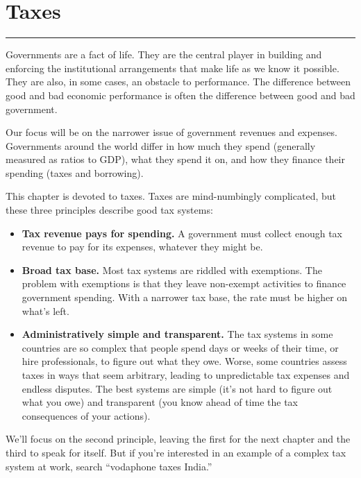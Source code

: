 \chapter{Taxes}\label{chp:tax}
\hypertarget{taxes}{}


\rule{\textwidth}{1pt}

Governments are a fact of life. They are the central player in building and enforcing
the institutional arrangements that make %
life as we know it possible.
They are also, in some cases, an obstacle to performance.
The difference between good and bad economic performance
is often the difference between good and bad government.

Our focus will be on the narrower issue of government revenues and expenses.
Governments around the world differ
in how much they spend (generally measured as ratios to GDP),
what they spend it on,
and how they finance their spending (taxes and borrowing).

This chapter is devoted to taxes.
Taxes are mind-numbingly complicated, but these three principles
describe good tax systems:
%
\begin{itemize}
\item \textbf{Tax  revenue pays for spending.}
A government must collect enough tax revenue to pay for its expenses,
whatever they might be.

\item \textbf{Broad tax base. }
Most tax systems are riddled with exemptions.
The problem with exemptions is that they leave non-exempt activities to finance government spending.
With a narrower tax base, the rate must be higher on what's left.

\item \textbf{Administratively simple and transparent.}
The tax systems in some countries are so complex that people spend
days or weeks of their time, or hire professionals, to figure out
what they owe.
Worse, some countries assess taxes in ways that seem arbitrary,
leading to unpredictable tax expenses and endless disputes.
The best systems are simple (it's not hard to figure out what you owe)
and transparent (you know ahead of time the tax consequences of your actions).

\end{itemize}
%
We'll focus on the second principle, leaving the first for the next chapter
and the third to speak for itself.
But if you're interested in an example of a complex tax system
at work, search ``vodaphone taxes India.''


